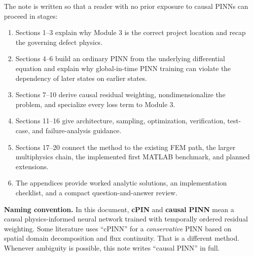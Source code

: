 \documentclass[11pt]{article}
\begin{document}
The note is written so that a reader with no prior exposure to causal PINNs can proceed in stages:
\begin{enumerate}[label=\arabic*.]
    \item Sections 1--3 explain why Module 3 is the correct project location and recap the governing defect physics.
    \item Sections 4--6 build an ordinary PINN from the underlying differential equation and explain why global-in-time PINN training can violate the dependency of later states on earlier states.
    \item Sections 7--10 derive causal residual weighting, nondimensionalize the problem, and specialize every loss term to Module 3.
    \item Sections 11--16 give architecture, sampling, optimization, verification, test-case, and failure-analysis guidance.
    \item Sections 17--20 connect the method to the existing FEM path, the larger multiphysics chain, the implemented first MATLAB benchmark, and planned extensions.
    \item The appendices provide worked analytic solutions, an implementation checklist, and a compact question-and-answer review.
\end{enumerate}

\begin{notebox}
\textbf{Naming convention.} In this document, \textbf{cPIN} and \textbf{causal PINN} mean a causal physics-informed neural network trained with temporally ordered residual weighting. Some literature uses ``cPINN'' for a \emph{conservative} PINN based on spatial domain decomposition and flux continuity. That is a different method. Whenever ambiguity is possible, this note writes ``causal PINN'' in full.
\end{notebox}

\SymbolsAcronymsSection
\end{document}
